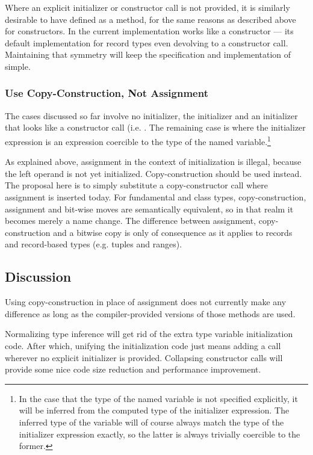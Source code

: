 Where an explicit initializer or constructor call is not provided, it is similarly desirable to have
 defined as a method, for the same reasons as described above for
constructors.  In the current implementation  works like a constructor
--- its default implementation for record types even devolving to a constructor call.
Maintaining that symmetry will keep the specification and implementation of
 simple.

\subsubsection{Use Copy-Construction, Not Assignment}

The cases discussed so far involve no initializer, the  initializer and an
initializer that looks like a constructor call (i.e. .  The remaining
case is where the initializer expression is an expression coercible to the type of the
named variable.\footnote{In the case that the type of the named variable is not specified
  explicitly, it will be inferred from the computed type of the initializer expression.
  The inferred type of the variable will of course always match the type of the
  initializer expression exactly, so the latter is always trivially coercible to the
  former.}

As explained above, assignment in the context of initialization is illegal, because the
left operand is not yet initialized.  Copy-construction should be used instead.  The
proposal here is to simply substitute a copy-constructor call where assignment is inserted
today.  For fundamental and class types, copy-construction, assignment and bit-wise moves are
semantically equivalent, so in that realm it becomes merely a name change.  The difference
between assignment, copy-construction and a bitwise copy is only of consequence as it
applies to records and record-based types (e.g. tuples and ranges).

\subsection{Discussion}

Using copy-construction in place of assignment does not currently make any difference as
long as the compiler-provided versions of those methods are used.  

Normalizing type inference will get rid of the extra type variable initialization code.
After which, unifying the initialization code just means adding a  call
wherever no explicit initializer is provided.  Collapsing constructor calls will provide
some nice code size reduction and performance improvement.

